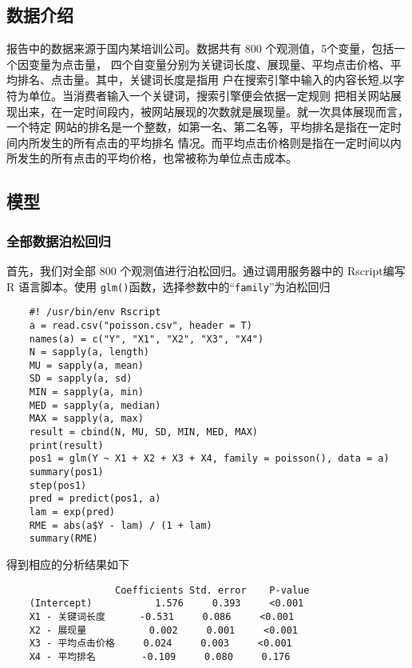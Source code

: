 \subsection{数据介绍}\label{ux6570ux636eux4ecbux7ecd}

报告中的数据来源于国内某培训公司。数据共有 800
个观测值，5个变量，包括一个因变量为点击量，
四个自变量分别为关键词长度、展现量、平均点击价格、平均排名、点击量。其中，关键词长度是指用
户在搜索引擎中输入的内容长短,以字符为单位。当消费者输入一个关键词，搜索引擎便会依据一定规则
把相关网站展现出来，在一定时间段内，被网站展现的次数就是展现量。就一次具体展现而言，一个特定
网站的排名是一个整数，如第一名、第二名等，平均排名是指在一定时间内所发生的所有点击的平均排名
情况。而平均点击价格则是指在一定时间以内所发生的所有点击的平均价格，也常被称为单位点击成本。

\subsection{模型}\label{ux6a21ux578b}

\subsubsection{全部数据泊松回归}\label{ux5168ux90e8ux6570ux636eux6ccaux677eux56deux5f52}

首先，我们对全部 800 个观测值进行泊松回归。通过调用服务器中的 Rscript编写
R 语言脚本。使用 \lstinline!glm()!函数，选择参数中的``\lstinline!family!''为泊松回归

\begin{lstlisting}
	#! /usr/bin/env Rscript
	a = read.csv("poisson.csv", header = T)
	names(a) = c("Y", "X1", "X2", "X3", "X4")
	N = sapply(a, length)
	MU = sapply(a, mean)
	SD = sapply(a, sd)
	MIN = sapply(a, min)
	MED = sapply(a, median)
	MAX = sapply(a, max)
	result = cbind(N, MU, SD, MIN, MED, MAX)
	print(result)
	pos1 = glm(Y ~ X1 + X2 + X3 + X4, family = poisson(), data = a)
	summary(pos1)
	step(pos1)
	pred = predict(pos1, a)
	lam = exp(pred)
	RME = abs(a$Y - lam) / (1 + lam)
	summary(RME)
\end{lstlisting}

得到相应的分析结果如下

\begin{lstlisting}
	               Coefficients Std. error    P-value
	(Intercept)           1.576     0.393     <0.001
	X1 - 关键词长度      -0.531     0.086     <0.001
	X2 - 展现量           0.002     0.001     <0.001
	X3 - 平均点击价格     0.024     0.003     <0.001
	X4 - 平均排名        -0.109     0.080     0.176
\end{lstlisting}


